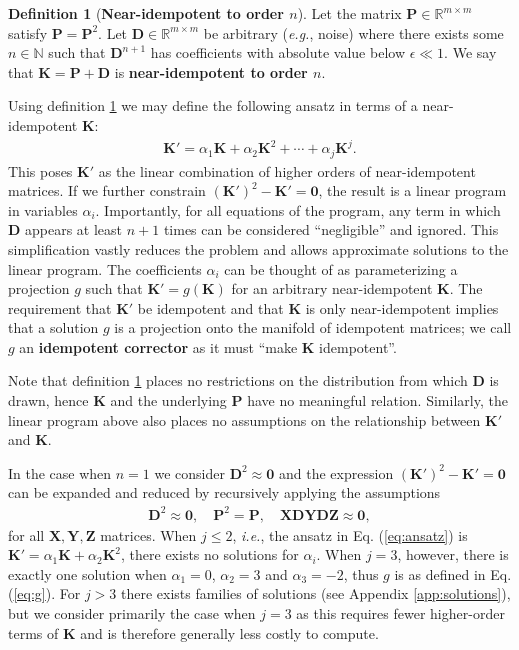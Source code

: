 \documentclass{article}
\theoremstyle{plain}
\theoremstyle{definition}
\newtheorem{definition}[theorem]{Definition}
\theoremstyle{remark}
\newcommand{\vD}{\mathbf{D}}
\newcommand{\vK}{\mathbf{K}}
\newcommand{\vP}{\mathbf{P}}
\newcommand{\vX}{\mathbf{X}}
\newcommand{\vY}{\mathbf{Y}}
\newcommand{\vZ}{\mathbf{Z}}
\begin{document}
\begin{definition}[\textbf{Near-idempotent to order $n$}]
    Let the matrix ${\vP \in \mathbb{R}^{m \times m}}$ satisfy ${\vP = \vP^2}$. Let ${\vD \in \mathbb{R}^{m \times m}}$ be arbitrary (\textit{e.g.}, noise) where there exists some ${n \in \mathbb{N}}$ such that $\vD^{n+1}$ has coefficients with absolute value below $\epsilon \ll 1$. We say that ${\vK = \vP + \vD}$ is \textbf{near-idempotent to order $n$}.
    \label{def:near-idem}
\end{definition}

Using definition \ref{def:near-idem} we may define the following ansatz in terms of a near-idempotent $\vK$:
%
\begin{align}
    \vK' = \alpha_1 \vK + \alpha_2 \vK^2 + \cdots + \alpha_j \vK^j.
    \label{eq:ansatz}
\end{align}
%
This poses $\vK'$ as the linear combination of higher orders of near-idempotent matrices. If we further constrain ${(\vK')^2 - \vK' = \bm{0}}$, the result is a linear program in variables $\alpha_i$. Importantly, for all equations of the program, any term in which $\vD$ appears at least $n+1$ times can be considered ``negligible'' and ignored. This simplification vastly reduces the problem and allows approximate solutions to the linear program. The coefficients $\alpha_i$ can be thought of as parameterizing a projection $g$ such that ${\vK' = g(\vK)}$ for an arbitrary near-idempotent $\vK$. The requirement that $\vK'$ be idempotent and that $\vK$ is only near-idempotent implies that a solution $g$ is a projection onto the manifold of idempotent matrices; we call $g$ an \textbf{idempotent corrector} as it must ``make $\vK$ idempotent''.

Note that definition \ref{def:near-idem} places no restrictions on the distribution from which $\vD$ is drawn, hence $\vK$ and the underlying $\vP$ have no meaningful relation. Similarly, the linear program above also places no assumptions on the relationship between $\vK'$ and $\vK$.

In the case when $n=1$ we consider ${\vD^2 \approx \bm{0}}$ and the expression ${(\vK')^2 - \vK' = \bm{0}}$ can be expanded and reduced by recursively applying the assumptions
%
\begin{align}
    \vD^2 \approx \bm{0}, \quad \vP^2 = \vP, \quad \vX \vD \vY \vD \vZ \approx \bm{0},
\end{align}
%
for all $\vX,\vY,\vZ$ matrices. When $j\leq2$, \textit{i.e.}, the ansatz in Eq. (\ref{eq:ansatz}) is ${\vK' = \alpha_1 \vK + \alpha_2 \vK^2}$, there exists no solutions for $\alpha_i$. When $j=3$, however, there is exactly one solution when ${\alpha_1 = 0}$, ${\alpha_2 = 3}$ and ${\alpha_3 = -2}$, thus $g$ is as defined in Eq. (\ref{eq:g}). For $j>3$ there exists families of solutions (see Appendix \ref{app:solutions}), but we consider primarily the case when $j=3$ as this requires fewer higher-order terms of $\vK$ and is therefore generally less costly to compute.
\end{document}
